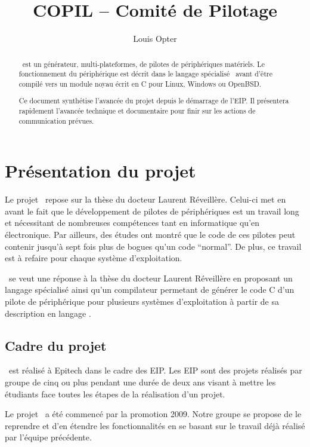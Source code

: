 \documentclass[francais]{rtxreport}
\author{Louis Opter} \title{COPIL -- Comité de Pilotage}
\begin{document}
\maketitle

\begin{abstract}
\rtx\ est un générateur, multi-plateformes, de pilotes de périphériques
matériels. Le fonctionnement du périphérique est décrit dans le langage
spécialisé \rtx\ avant d'être compilé vers un module noyau écrit en C pour
Linux, Windows ou OpenBSD.

Ce document synthétise l'avancée du projet depuis le démarrage de l'EIP. Il
présentera rapidement l’avancée technique et documentaire pour finir sur les
actions de communication prévues.
\end{abstract}

\rtxmaketitleblock

\tableofcontents

\chapter{Présentation du projet}

Le projet \rtx\ repose sur la thèse du docteur Laurent Réveillère. Celui-ci met
en avant le fait que le développement de pilotes de périphériques est un travail
long et nécessitant de nombreuses compétences tant en informatique qu'en
électronique. Par ailleurs, des études ont montré que le code de ces pilotes
peut contenir jusqu'à sept fois plus de bogues qu'un code ``normal''. De plus,
ce travail est à refaire pour chaque système d'exploitation.

\rtx\ se veut une réponse à la thèse du docteur Laurent Réveillère en proposant
un langage spécialisé ainsi qu'un compilateur permetant de générer le code C
d'un pilote de périphérique pour plusieurs systèmes d'exploitation à partir de
sa description en langage \rtx.

\section{Cadre du projet}
\rtx\ est réalisé à Epitech dans le cadre des EIP. Les EIP sont des projets
réalisés par groupe de cinq ou plus pendant une durée de deux ans visant à
mettre les étudiants face toutes les étapes de la réalisation d'un projet.

Le projet \rtx\ a été commencé par la promotion 2009. Notre groupe se propose de
le reprendre et d'en étendre les fonctionnalités en se basant sur le travail déjà
réalisé par l'équipe précédente.
\end{document}
